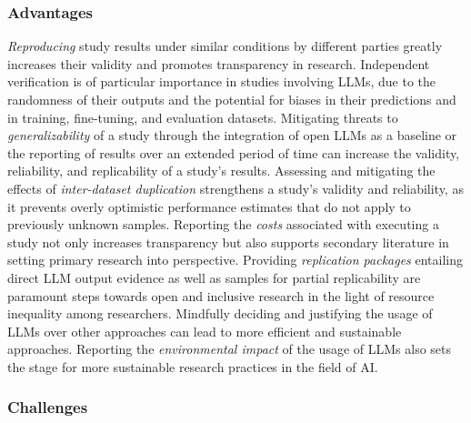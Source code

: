 \subsubsection{Advantages}

\emph{Reproducing} study results under similar conditions by different parties greatly increases their validity and promotes transparency in research.
Independent verification is of particular importance in studies involving LLMs, due to the randomness of their outputs and the potential for biases in their predictions and in training, fine-tuning, and evaluation datasets.
Mitigating threats to \emph{generalizability} of a study through the integration of open LLMs as a baseline or the reporting of results over an extended period of time can increase the validity, reliability, and replicability of a study's results.
Assessing and mitigating the effects of \emph{inter-dataset duplication} strengthens a study's validity and reliability, as it prevents overly optimistic performance estimates that do not apply to previously unknown samples.
Reporting the \emph{costs} associated with executing a study not only increases transparency but also supports secondary literature in setting primary research into perspective.
Providing \emph{replication packages} entailing direct LLM output evidence as well as samples for partial replicability are paramount steps towards open and inclusive research in the light of resource inequality among researchers.
Mindfully deciding and justifying the usage of LLMs over other approaches can lead to more efficient and sustainable approaches. 
Reporting the \emph{environmental impact} of the usage of LLMs also sets the stage for more sustainable research practices in the field of AI.


\subsubsection{Challenges}


